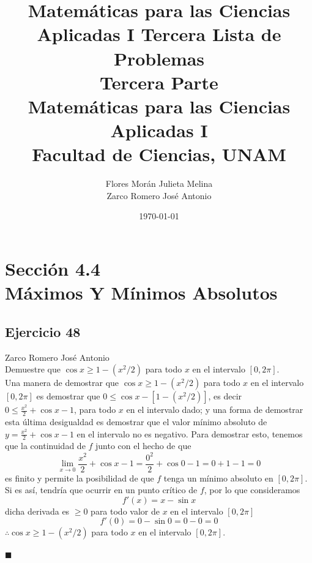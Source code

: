 \documentclass[12pt]{article}
\title{Matemáticas para las Ciencias Aplicadas I}
\title{
	Tercera Lista de Problemas \\
	\textbf{Tercera  Parte} \\
	\vspace{1ex}
	\large Matemáticas para las Ciencias Aplicadas I \\
	Facultad de Ciencias, UNAM}
\date{\today}
\author{Flores Morán Julieta Melina \\ Zarco Romero José Antonio}
\begin{document}
\maketitle


\section{Sección 4.4 \\ Máximos Y Mínimos Absolutos}
\subsection{Ejercicio 48} Zarco Romero José Antonio \\

Demuestre que $\cos{x} \geq 1-(x^2 /2)$ para todo $x$ en el intervalo $[0, 2\pi]$. \\

Una manera de demostrar que $\cos{x} \geq 1-(x^2 /2)$ para todo $x$ en el intervalo $[0, 2\pi]$ es demostrar que $0 \leq \cos{x}-[1-(x^2 /2)]$, es decir $0 \leq \frac{x^2}{2}+\cos{x}-1$, para todo $x$ en el intervalo dado; y una forma de demostrar esta última desigualdad es demostrar que el valor mínimo absoluto de $y=\frac{x^2}{2}+\cos{x}-1$ en el intervalo no es negativo. Para demostrar esto, tenemos que la continuidad de $f$ junto con el hecho de que
\[
\lim_{x \to 0} \frac{x^2}{2}+\cos{x}-1 = \frac{0^2}{2}+\cos{0}-1 = 0+1-1=0
\]
es finito y permite la posibilidad de que $f$ tenga un mínimo absoluto en $[0, 2\pi]$. Si es así, tendría que ocurrir en un punto crítico de $f$, por lo que consideramos
\[
f'(x) = x-\sin{x}
\]
dicha derivada es $\geq 0$ para todo valor de $x$ en el intervalo $[0, 2\pi]$
\[
f'(0)=0-\sin{0}=0-0=0
\]
$\therefore \cos{x} \geq 1-(x^2 /2)$ para todo $x$ en el intervalo $[0, 2\pi]$.
\begin{flushright}
  $\blacksquare$
\end{flushright}

\end{document}

